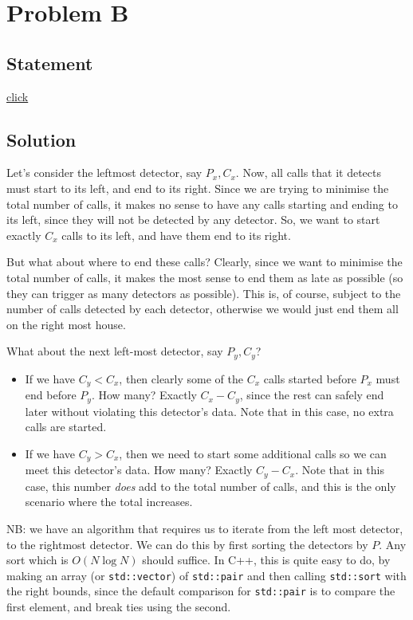 \section{Problem B}
\subsection{Statement}
\href{http://foobar.iiitd.edu.in/contest/team/problem.php?id=528}{click}

\subsection{Solution}
Let's consider the leftmost detector, say $P_x, C_x$. Now, all calls that it detects
must start to its left, and end to its right. Since we are trying to minimise the total number
of calls, it makes no sense to have any calls starting and ending to its left, since they
will not be detected by any detector.
So, we want to start exactly $C_x$ calls to its left, and have them end to its right.

But what about where to end these calls? Clearly, since we want to minimise the total number
of calls, it makes the most sense to end them as late as possible (so they can trigger
as many detectors as possible). This is, of course, subject to the number of calls detected
by each detector, otherwise we would just end them all on the right most house.

What about the next left-most detector, say $P_y, C_y$?
\begin{itemize}
\item If we have $C_y < C_x$, then clearly some of the $C_x$ calls started before $P_x$
must end before $P_y$. How many? Exactly $C_x - C_y$, since the rest can safely end later
without violating this detector's data. Note that in this case, no extra calls are started.

\item If we have $C_y > C_x$, then we need to start some additional calls so we can meet this
detector's data. How many? Exactly $C_y - C_x$. Note that in this case, this number \emph{does}
add to the total number of calls, and this is the only scenario where the total increases.
\end{itemize}

NB: we have an algorithm that requires us to iterate from the left most detector, to the 
rightmost detector. We can do this by first sorting the detectors by $P$. Any sort which is
$O(N\log N)$ should suffice. In C++, this is quite easy to do, by making an array
(or \verb|std::vector|) of \verb|std::pair| and then calling \verb|std::sort| with the right
bounds, since the default comparison for \verb|std::pair| is to compare the first element, and
break ties using the second. 